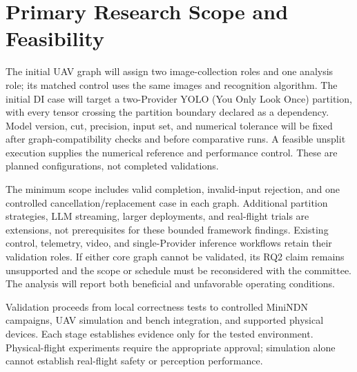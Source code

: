 \section{Primary Research Scope and Feasibility}
The initial UAV graph will assign two image-collection roles and one analysis role; its matched control uses the same images and recognition algorithm. The initial DI case will target a two-Provider YOLO (You Only Look Once) partition, with every tensor crossing the partition boundary declared as a dependency. Model version, cut, precision, input set, and numerical tolerance will be fixed after graph-compatibility checks and before comparative runs. A feasible unsplit execution supplies the numerical reference and performance control. These are planned configurations, not completed validations.

The minimum scope includes valid completion, invalid-input rejection, and one controlled cancellation/replacement case in each graph. Additional partition strategies, LLM streaming, larger deployments, and real-flight trials are extensions, not prerequisites for these bounded framework findings. Existing control, telemetry, video, and single-Provider inference workflows retain their validation roles. If either core graph cannot be validated, its RQ2 claim remains unsupported and the scope or schedule must be reconsidered with the committee. The analysis will report both beneficial and unfavorable operating conditions.

Validation proceeds from local correctness tests to controlled MiniNDN campaigns, UAV simulation and bench integration, and supported physical devices. Each stage establishes evidence only for the tested environment. Physical-flight experiments require the appropriate approval; simulation alone cannot establish real-flight safety or perception performance.


